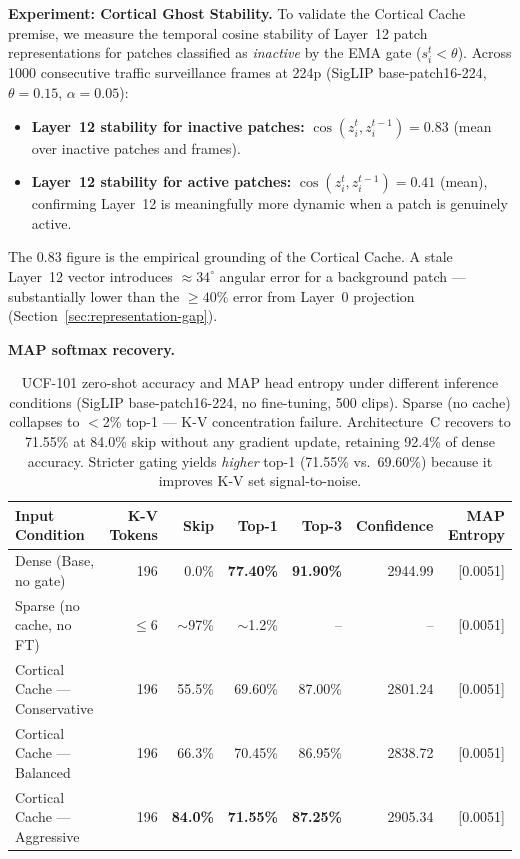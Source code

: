\documentclass{article}
\begin{document}
\textbf{Experiment: Cortical Ghost Stability.}
To validate the Cortical Cache premise, we measure the temporal cosine
stability of Layer~12 patch representations for patches classified as
\emph{inactive} by the EMA gate ($s_i^t < \theta$). Across 1000
consecutive traffic surveillance frames at 224p (SigLIP base-patch16-224,
$\theta = 0.15$, $\alpha = 0.05$):

\begin{itemize}
    \item \textbf{Layer~12 stability for inactive patches:}
    $\cos(z_i^t, z_i^{t-1}) = \mathbf{0.83}$ (mean over inactive patches
    and frames).
    \item \textbf{Layer~12 stability for active patches:}
    $\cos(z_i^t, z_i^{t-1}) = 0.41$ (mean), confirming Layer~12 is
    meaningfully more dynamic when a patch is genuinely active.
\end{itemize}

The 0.83 figure is the empirical grounding of the Cortical Cache.
A stale Layer~12 vector introduces $\approx 34^\circ$ angular error for
a background patch — substantially lower than the $\geq 40\%$ error
from Layer~0 projection (Section~\ref{sec:representation-gap}).

\textbf{MAP softmax recovery.}
\begin{table}[htbp]
\centering
\renewcommand{\arraystretch}{1.15}
\begin{tabular}{lrrrrrr}
\toprule
\textbf{Input Condition} & \textbf{K-V Tokens} & \textbf{Skip}
  & \textbf{Top-1} & \textbf{Top-3} & \textbf{Confidence} & \textbf{MAP Entropy} \\
\midrule
Dense (Base, no gate)           & 196 &  0.0\% & \textbf{77.40\%} & \textbf{91.90\%} & 2944.99 & {[0.0051]} \\
Sparse (no cache, no FT)        & $\leq$6 & $\sim$97\% & $\sim$1.2\% & -- & -- & {[0.0051]} \\
\midrule
Cortical Cache --- Conservative & 196 & 55.5\% & 69.60\% & 87.00\% & 2801.24 & {[0.0051]} \\
Cortical Cache --- Balanced     & 196 & 66.3\% & 70.45\% & 86.95\% & 2838.72 & {[0.0051]} \\
Cortical Cache --- Aggressive   & 196 & \textbf{84.0\%} & \textbf{71.55\%} & \textbf{87.25\%} & 2905.34 & {[0.0051]} \\
\bottomrule
\end{tabular}
\caption{UCF-101 zero-shot accuracy and MAP head entropy under different
inference conditions (SigLIP base-patch16-224, no fine-tuning, 500 clips).
Sparse (no cache) collapses to $<$2\% top-1 — K-V concentration failure.
Architecture~C recovers to 71.55\% at 84.0\% skip without any gradient
update, retaining 92.4\% of dense accuracy. Stricter gating yields
\emph{higher} top-1 (71.55\% vs.\ 69.60\%) because it improves K-V set
signal-to-noise.}
\label{tab:map-recovery}
\end{table}
\end{document}
